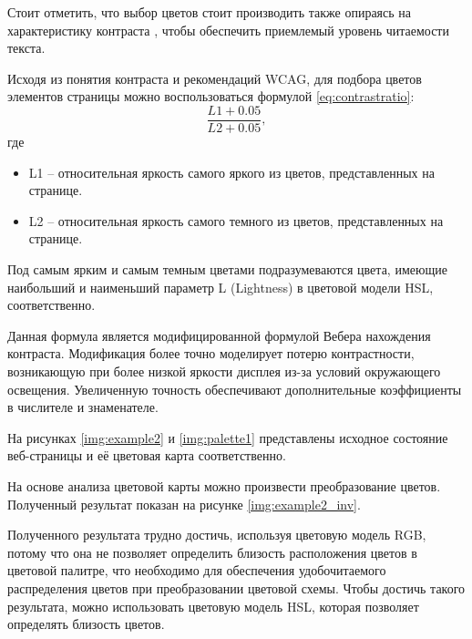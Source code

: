 Стоит отметить, что выбор цветов стоит производить также опираясь на характеристику контраста \cite{contrast}, чтобы обеспечить приемлемый уровень читаемости текста.

Исходя из понятия контраста и рекомендаций WCAG, для подбора цветов элементов страницы можно воспользоваться формулой  \ref{eq:contrastratio}:
\begin{equation}
	\label{eq:contrastratio}
	\frac{L1 + 0.05}{L2 + 0.05},
\end{equation}
где
\begin{itemize}
	\item L1 -- относительная яркость \cite{relativeluminance} самого яркого из цветов, представленных на странице.
	\item L2 -- относительная яркость самого темного из цветов, представленных на странице.
\end{itemize}

Под самым ярким и самым темным цветами подразумеваются цвета, имеющие наибольший и наименьший параметр L (Lightness) в цветовой модели HSL, соответственно.

Данная формула является модифицированной формулой Вебера \cite{weber} нахождения контраста. Модификация более точно моделирует потерю контрастности, возникающую при более низкой яркости дисплея из-за условий окружающего освещения. Увеличенную точность обеспечивают дополнительные коэффициенты в числителе и знаменателе.

На рисунках \ref{img:example2} и \ref{img:palette1} представлены исходное состояние веб-страницы и её цветовая карта соответственно.

\clearpage


\clearpage

На основе анализа цветовой карты можно произвести преобразование цветов. Полученный результат показан на рисунке \ref{img:example2_inv}.


Полученного результата трудно достичь, используя цветовую модель RGB, потому что она не позволяет определить близость расположения цветов в цветовой палитре, что необходимо для обеспечения удобочитаемого распределения цветов при преобразовании цветовой схемы. Чтобы достичь такого результата, можно использовать цветовую модель HSL, которая позволяет определять близость цветов.

